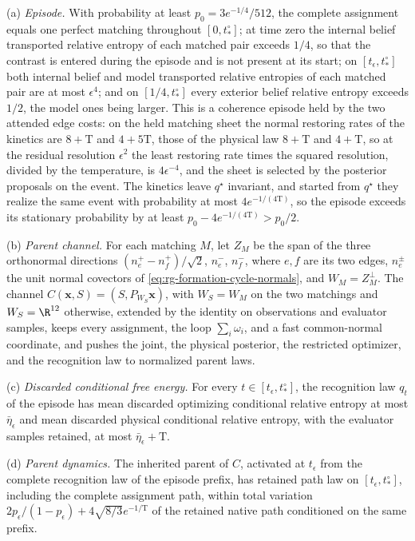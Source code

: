 (a) \emph{Episode.} With probability at least
\(p_0=3e^{-1/4}/512\), the complete assignment equals one perfect matching
throughout \([0,t^\circ_*]\); at time zero the internal belief transported
relative entropy of each matched pair exceeds \(1/4\), so that the contrast is
entered during the episode and is not present at its start; on
\([t_\epsilon,t^\circ_*]\) both internal belief and model transported relative
entropies of each matched pair are at most \(\epsilon^4\); and on
\([1/4,t^\circ_*]\) every exterior belief relative entropy exceeds \(1/2\), the
model ones being larger. This is a coherence episode held by the two attended
edge costs: on the held matching sheet the normal restoring rates of the
kinetics are \(8+\mathrm T\) and \(4+5\mathrm T\), those of the physical law
\(8+\mathrm T\) and \(4+\mathrm T\), so at the residual resolution
\(\epsilon^2\) the least restoring rate times the squared resolution, divided
by the temperature, is \(4\epsilon^{-4}\), and the sheet is selected by the
posterior proposals on the event. The kinetics leave \(q^\star\) invariant,
and started from \(q^\star\) they realize the same event with probability at
most \(4e^{-1/(4\mathrm T)}\), so the episode exceeds its stationary
probability by at least \(p_0-4e^{-1/(4\mathrm T)}>p_0/2\).

(b) \emph{Parent channel.} For each matching \(M\), let \(Z_M\) be the span of
the three orthonormal directions
\((n^+_{e}-n^+_{f})/\sqrt2\), \(n^-_{e}\), \(n^-_{f}\), where \(e,f\) are its
two edges, \(n^\pm_e\) the unit normal covectors of
\cref{eq:rg-formation-cycle-normals}, and \(W_M=Z_M^\perp\). The channel
\(C(\mathbf x,S)=(S,P_{W_S}\mathbf x)\), with \(W_S=W_M\) on the two matchings
and \(W_S=\R^{12}\) otherwise, extended by the identity on observations and
evaluator samples, keeps every assignment, the loop
\(\sum_i\omega_i\), and a fast common-normal coordinate, and pushes the joint,
the physical posterior, the restricted optimizer, and the recognition law to
normalized parent laws.

(c) \emph{Discarded conditional free energy.} For every
\(t\in[t_\epsilon,t^\circ_*]\), the recognition law \(q_t\) of the episode
has mean discarded optimizing conditional relative entropy at most
\(\bar\eta_\epsilon\) and mean discarded physical conditional relative entropy,
with the evaluator samples retained, at most \(\bar\eta_\epsilon+\mathrm T\).

(d) \emph{Parent dynamics.} The inherited parent of \(C\), activated at
\(t_\epsilon\) from the complete recognition law of the episode prefix, has
retained path law on \([t_\epsilon,t^\circ_*]\), including the complete
assignment path, within total variation
\(2p_\epsilon/(1-p_\epsilon)+4\sqrt{8/3} e^{-1/\mathrm T}\) of the retained
native path conditioned on the same prefix.


